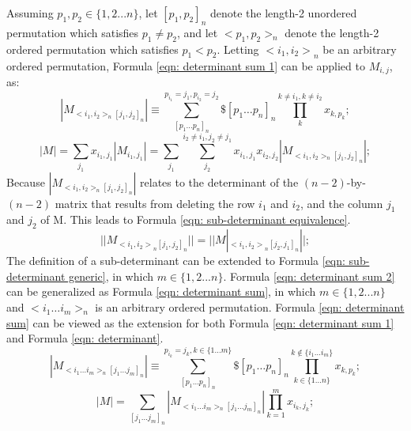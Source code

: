 \documentclass[twoside]{article}
\numberwithin{equation}{section}
\begin{document}
Assuming $p_{1}, p_{2} \in \{1,2...n\}$, let $[p_{1}, p_{2}]_{n}$ denote the length-2 unordered permutation which satisfies $p_{1} \neq p_{2}$, and let $<p_{1},p_{2}>_{n}$ denote the length-2 ordered permutation which satisfies $p_{1} < p_{2}$.  Letting ${<i_1,i_2>}_n$ be an arbitrary ordered permutation, Formula \eqref{eqn: determinant sum 1} can be applied to $M_{i,j}$, as:
\begin{equation}
|M_{<i_{1} ,i_{2}>_{n}[j_{1} ,j_{2}]_{n}}| \equiv \sum_{[p_{1} \dots p_{n}]_{n}}^{p_{i_{1}}=j_{1}, p_{i_{2}}=j_{2}} \$ [p_{1}\dots p_{n}]_{n} \prod _{k}^{k \ne i_{1}, k\ne i_{2}} x_{k,p_{k}};
\end{equation}
\begin{equation}
\label{eqn: determinant sum 2}
|M| = \sum_{j_{1}} x_{i_{1}, j_{1}} |M_{i_{1}, j_{1}}| = 
\sum_{j_{1}} \sum_{j_{2}}^{i_{2} \ne i_{1} , j_{2} \ne j_{1}} x_{i_{1}, j_{1}} x_{i_{2}, j_{2}} |M _{<i_{1}, i_{2}>_{n} [j_{1}, j_{2}]_{n}}|;
\end{equation}
Because $|M_{<i_{1} ,i_{2}>_{n}[j_{1} ,j_{2}]_{n}}|$ relates to the determinant of the $(n-2)$-by-$(n-2)$ matrix that results from deleting the row $i_{1}$ and $i_{2}$, and the column $j_{1}$ and $j_{2}$ of M.  This leads to Formula \eqref{eqn: sub-determinant equivalence}.
\begin{equation}
\label{eqn: sub-determinant equivalence}
||M_{{<i_{1},i_{2}>}_{n} {[j_{1},j_{2}]}_{n}}|| = ||M|_{{<i_{1},i_{2}>}_{n} {[j_{2},j_{1}]}_{n}}||  ;
\end{equation}
The definition of a sub-determinant can be extended to Formula \eqref{eqn: sub-determinant generic}, in which $m \in \{1,2...n\}$.  Formula \eqref{eqn: determinant sum 2} can be generalized as Formula \eqref{eqn: determinant sum}, in which $m \in \{1,2...n\}$ and $<i_{1} \dots i_{m}>_{n}$ is an arbitrary ordered permutation. Formula  \eqref{eqn: determinant sum} can be viewed as the extension for both Formula \eqref{eqn: determinant sum 1} and Formula \eqref{eqn: determinant}.
\begin{equation} 
\label{eqn: sub-determinant generic}
|M_{<i_{1} \dots i_{m}>_{n}[j_{1} \dots j_{m}]_{n}}| \equiv \sum_{[p_{1} \dots p_{n}]_{n}}^{p_{i_{k}}=j_{k}, k \in \{1 \dots m \}} \$ [p_{1}\dots p_{n}]_{n} \prod _{k \in \{1 \dots n \}}^{k \not\in \{i_{1} \dots i_{m}\}} x_{k,p_{k}};
\end{equation}
\begin{equation}\label{eqn: determinant sum}
|M| = \sum_{{[j_{1} \dots j_{m}]}_{n}}  
    |M _{<i_{1} \dots i_{m}>_{n} {[j_{1} \dots j_{m}]}_{n}}| 
    \prod _{k=1}^{m} x_{i_{k}, j_{k}};
\end{equation}
\end{document}
